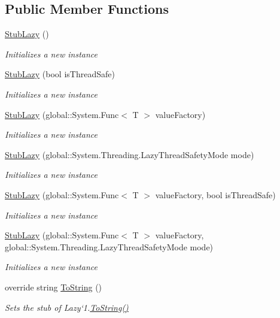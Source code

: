 \subsection*{Public Member Functions}
\begin{DoxyCompactItemize}
\item 
\hyperlink{class_system_1_1_fakes_1_1_stub_lazy_3_01_t_01_4_a415f5c049a712dfd401218143e2f6eb8}{Stub\-Lazy} ()
\begin{DoxyCompactList}\small\item\em Initializes a new instance\end{DoxyCompactList}\item 
\hyperlink{class_system_1_1_fakes_1_1_stub_lazy_3_01_t_01_4_a869f998ebbe08c85e2610c64ee08d7cc}{Stub\-Lazy} (bool is\-Thread\-Safe)
\begin{DoxyCompactList}\small\item\em Initializes a new instance\end{DoxyCompactList}\item 
\hyperlink{class_system_1_1_fakes_1_1_stub_lazy_3_01_t_01_4_a7390275f514b75c2b47f9403c85248de}{Stub\-Lazy} (global\-::\-System.\-Func$<$ T $>$ value\-Factory)
\begin{DoxyCompactList}\small\item\em Initializes a new instance\end{DoxyCompactList}\item 
\hyperlink{class_system_1_1_fakes_1_1_stub_lazy_3_01_t_01_4_a80ee079627fb888d939ffc6eeb12336f}{Stub\-Lazy} (global\-::\-System.\-Threading.\-Lazy\-Thread\-Safety\-Mode mode)
\begin{DoxyCompactList}\small\item\em Initializes a new instance\end{DoxyCompactList}\item 
\hyperlink{class_system_1_1_fakes_1_1_stub_lazy_3_01_t_01_4_af0bda2d8be49413c26111123b91b3acf}{Stub\-Lazy} (global\-::\-System.\-Func$<$ T $>$ value\-Factory, bool is\-Thread\-Safe)
\begin{DoxyCompactList}\small\item\em Initializes a new instance\end{DoxyCompactList}\item 
\hyperlink{class_system_1_1_fakes_1_1_stub_lazy_3_01_t_01_4_a448997bef0b6d87257744343fe736b82}{Stub\-Lazy} (global\-::\-System.\-Func$<$ T $>$ value\-Factory, global\-::\-System.\-Threading.\-Lazy\-Thread\-Safety\-Mode mode)
\begin{DoxyCompactList}\small\item\em Initializes a new instance\end{DoxyCompactList}\item 
override string \hyperlink{class_system_1_1_fakes_1_1_stub_lazy_3_01_t_01_4_aee5547fcc578aeced2fc205244ccb84b}{To\-String} ()
\begin{DoxyCompactList}\small\item\em Sets the stub of Lazy`1.\hyperlink{class_system_1_1_fakes_1_1_stub_lazy_3_01_t_01_4_aee5547fcc578aeced2fc205244ccb84b}{To\-String()}\end{DoxyCompactList}\end{DoxyCompactItemize}
